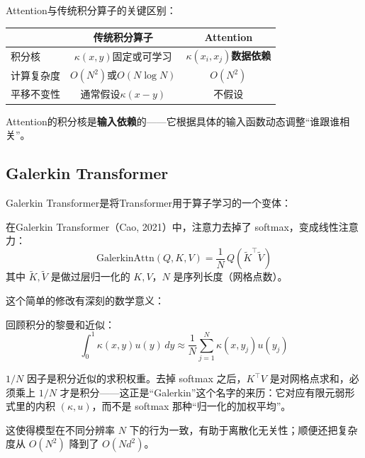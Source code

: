 \begin{insightbox}
Attention与传统积分算子的关键区别：

\begin{center}
\begin{tabular}{l|cc}
\toprule
& \textbf{传统积分算子} & \textbf{Attention} \\
\midrule
积分核 & $\kappa(x, y)$固定或可学习 & $\kappa(x_i, x_j)$\textbf{数据依赖} \\
计算复杂度 & $O(N^2)$或$O(N \log N)$ & $O(N^2)$ \\
平移不变性 & 通常假设$\kappa(x-y)$ & 不假设 \\
\bottomrule
\end{tabular}
\end{center}

Attention的积分核是\textbf{输入依赖}的——它根据具体的输入函数动态调整“谁跟谁相关”。
\end{insightbox}

\subsection{Galerkin Transformer}

Galerkin Transformer是将Transformer用于算子学习的一个变体：

\begin{definition}
在Galerkin Transformer（Cao, 2021）中，注意力去掉了 softmax，变成线性注意力：
\begin{equation}
    \text{GalerkinAttn}(Q, K, V) = \frac{1}{N}\, Q \left( \tilde{K}^\top \tilde{V} \right)
\end{equation}
其中 $\tilde{K}, \tilde{V}$ 是做过层归一化的 $K, V$，$N$ 是序列长度（网格点数）。
\end{definition}

这个简单的修改有深刻的数学意义：

\begin{remark}[为什么除以$N$？]
回顾积分的黎曼和近似：
\begin{equation}
    \int_0^1 \kappa(x, y) u(y) \, dy \approx \frac{1}{N} \sum_{j=1}^{N} \kappa(x, y_j) u(y_j)
\end{equation}

$1/N$ 因子是积分近似的求积权重。去掉 softmax 之后，$K^\top V$ 是对网格点求和，必须乘上 $1/N$ 才是积分——这正是“Galerkin”这个名字的来历：它对应有限元弱形式里的内积 $(\kappa, u)$，而不是 softmax 那种“归一化的加权平均”。

这使得模型在不同分辨率 $N$ 下的行为一致，有助于离散化无关性；顺便还把复杂度从 $O(N^2)$ 降到了 $O(N d^2)$。
\end{remark}

